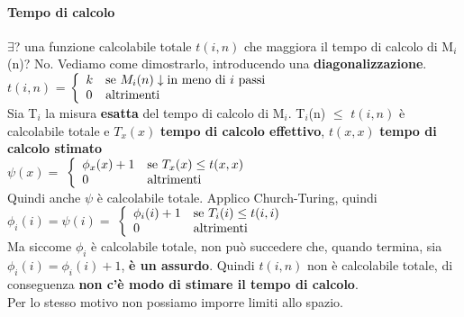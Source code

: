 \documentclass[10pt]{book}
\begin{document}
\paragraph{Tempo di calcolo} $\exists$? una funzione calcolabile totale $t(i, n)$ che maggiora il tempo di calcolo di M$_i$(n)? No. Vediamo come dimostrarlo, introducendo una \textbf{diagonalizzazione}.\\
$t(i, n)$ = \begin{math}
\left\{
\begin{array}{l l}
	k & \text{se }M_i(n)\downarrow \text{in meno di }i\text{ passi}\\
	0 & \text{altrimenti}
\end{array}
\right.
\end{math}\\
Sia T$_i$ la misura \textbf{esatta} del tempo di calcolo di M$_i$. T$_i$(n) $\leq$ $t(i, n)$ è calcolabile totale e $T_x(x)$ \textbf{tempo di calcolo effettivo}, $t(x, x)$ \textbf{tempo di calcolo stimato}\\
$\psi(x) = $
\begin{math}
\left\{
\begin{array}{l l}
	\phi_x(x) + 1 & \text{se }T_x(x) \leq t(x, x)\\
	0 & \text{altrimenti}
\end{array}
\right.
\end{math}\\
Quindi anche $\psi$ è calcolabile totale. Applico Church-Turing, quindi $\phi_i(i) = \psi(i) =$ \begin{math}
\left\{
\begin{array}{l l}
	\phi_i(i) + 1 & \text{se }T_i(i) \leq t(i, i)\\
	0 & \text{altrimenti}
\end{array}
\right.
\end{math}\\
Ma siccome $\phi_i$ è calcolabile totale, non può succedere che, quando termina, sia $\phi_i(i) = \phi_i(i) + 1$, \textbf{è un assurdo}. Quindi $t(i, n)$ non è calcolabile totale, di conseguenza \textbf{non c'è modo di stimare il tempo di calcolo}.\\
Per lo stesso motivo non possiamo imporre limiti allo spazio.
\end{document}
